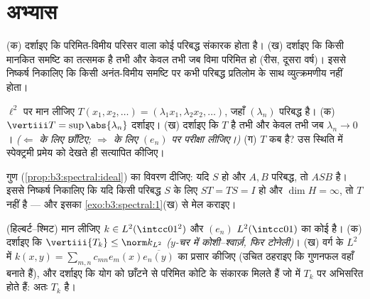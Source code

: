 \section{अभ्यास}

\begin{exercise}[$\star$]\label{exo:b3:spectral:1}
(क) दर्शाइए कि परिमित-विमीय परिसर वाला कोई परिबद्ध संकारक 
होता है।
(ख) दर्शाइए कि किसी मानकित समष्टि का तत्समक  है तभी और केवल
तभी जब विमा परिमित हो (रीस, दूसरा वर्ष)। इससे निष्कर्ष निकालिए कि
किसी अनंत-विमीय समष्टि पर  कभी परिबद्ध प्रतिलोम के साथ
व्युत्क्रमणीय नहीं होता।
\end{exercise}

\begin{exercise}[$\star$]\label{exo:b3:spectral:2}
$\ell^2$ पर मान लीजिए $T(x_1, x_2, \dots) = (\lambda_1x_1, \lambda_2x_2, \dots)$, जहाँ $(\lambda_n)$ परिबद्ध है।
(क) $\vertiii T = \sup\abs{\lambda_n}$ दर्शाइए।
(ख) दर्शाइए कि $T$  है तभी और केवल तभी जब $\lambda_n \to 0$।
\emph{($\Leftarrow$ के लिए छाँटिए; $\Rightarrow$ के लिए $(e_n)$ पर परीक्षा लीजिए।)}
(ग) $T$ कब  है? उस स्थिति में स्पेक्ट्रमी प्रमेय को
देखते ही सत्यापित कीजिए।
\end{exercise}

\begin{exercise}[$\star\star$]\label{exo:b3:spectral:3}
 गुण (\cref{prop:b3:spectral:ideal}) का विवरण दीजिए: यदि $S$  हो और $A, B$
परिबद्ध, तो $ASB$  है। इससे निष्कर्ष निकालिए कि यदि किसी
परिबद्ध $S$ के लिए $ST = TS = I$ हो और $\dim H = \infty$, तो $T$  नहीं है ---
और इसका \cref{exo:b3:spectral:1}(ख) से मेल कराइए।
\end{exercise}

\begin{exercise}[$\star\star$]\label{exo:b3:spectral:4}
(हिल्बर्ट--श्मिट) मान लीजिए $k \in L^2(\intcc01^2)$ और $(e_n)$ $L^2(\intcc01)$ का कोई  है।
(क) दर्शाइए कि $\vertiii{T_k} \leq \norm k_{L^2}$ \emph{($y$-चर में कोशी--श्वार्ज़, फिर
टोनेली)}।
(ख) वर्ग के $L^2$ में $k(x,y) = \sum_{m,n}c_{mn}e_m(x)\overline{e_n(y)}$ का प्रसार कीजिए (उचित ठहराइए कि
गुणनफल वहाँ  बनाते हैं), और दर्शाइए कि योग को छाँटने
से परिमित कोटि के संकारक मिलते हैं जो  में $T_k$ पर
अभिसरित होते हैं: अतः $T_k$  है।
\end{exercise}

